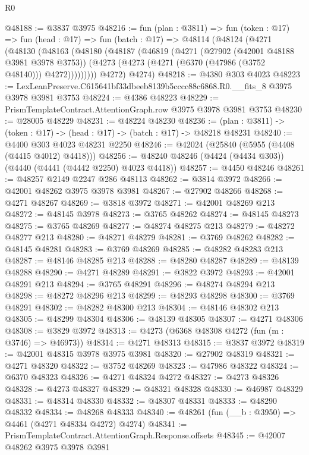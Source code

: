 \begin{lexlean}{R0}
\begin{coremodule}
@48188 := @3837 @3975
@48216 := fun (plan : @3811) =>
  fun (token : @17) =>
  fun (head : @17) =>
  fun (batch : @17) =>
  @48114
    (@48124
      (@4271
        (@48130
          (@48163
            (@48180
              (@48187
                (@46819
                  (@4271
                    (@27902 (@42001 @48188 @3981 @3978 @3753))
                    (@4273 (@4273 (@4271 (@6370 (@47986 (@3752 @48140))) @4272)))))))))
        @4272)
      @4274)
@48218 := @4380 @303 @4023
@48223 := LexLeanPreserve.C615641bf33dbeeb8139b5cccc88c6868.R0.__fits_8 @3975 @3978 @3981 @3753
@48224 := @4386 @48223
@48229 := PrismTemplateContract.AttentionGraph.row @3975 @3978 @3981 @3753
@48230 := @28005 @48229
@48231 := @48224 @48230
@48236 := (plan : @3811) -> (token : @17) -> (head : @17) -> (batch : @17) -> @48218 @48231
@48240 := @4400 @303 @4023 @48231 @2250
@48246 := @42024 (@25840 (@5955 (@4408 (@4415 @4012) @4418)))
@48256 := @48240 @48246 (@4424 (@4434 @303)) (@4440 (@4441 (@4442 @2250) @4023 @4418))
@48257 := @4450 @48246
@48261 := @48257 @2149 @2247 @286 @48113
@48262 := @3814 @3972
@48266 := @42001 @48262 @3975 @3978 @3981
@48267 := @27902 @48266
@48268 := @4271 @48267
@48269 := @3818 @3972
@48271 := @42001 @48269 @213
@48272 := @48145 @3978
@48273 := @3765 @48262
@48274 := @48145 @48273
@48275 := @3765 @48269
@48277 := @48274 @48275 @213
@48279 := @48272 @48277 @213
@48280 := @48271 @48279
@48281 := @3769 @48262
@48282 := @48145 @48281
@48283 := @3769 @48269
@48285 := @48282 @48283 @213
@48287 := @48146 @48285 @213
@48288 := @48280 @48287
@48289 := @48139 @48288
@48290 := @4271 @48289
@48291 := @3822 @3972
@48293 := @42001 @48291 @213
@48294 := @3765 @48291
@48296 := @48274 @48294 @213
@48298 := @48272 @48296 @213
@48299 := @48293 @48298
@48300 := @3769 @48291
@48302 := @48282 @48300 @213
@48304 := @48146 @48302 @213
@48305 := @48299 @48304
@48306 := @48139 @48305
@48307 := @4271 @48306
@48308 := @3829 @3972
@48313 := @4273 (@6368 @48308 @4272 (fun (m : @3746) => @46973))
@48314 := @4271 @48313
@48315 := @3837 @3972
@48319 := @42001 @48315 @3978 @3975 @3981
@48320 := @27902 @48319
@48321 := @4271 @48320
@48322 := @3752 @48269
@48323 := @47986 @48322
@48324 := @6370 @48323
@48326 := @4271 @48324 @4272
@48327 := @4273 @48326
@48328 := @4273 @48327
@48329 := @48321 @48328
@48330 := @46987 @48329
@48331 := @48314 @48330
@48332 := @48307 @48331
@48333 := @48290 @48332
@48334 := @48268 @48333
@48340 := @48261 (fun (__b : @3950) => @4461 (@4271 @48334 @4272) @4274)
@48341 := PrismTemplateContract.AttentionGraph.Response.offsets
@48345 := @42007 @48262 @3975 @3978 @3981

\end{coremodule}
\end{lexlean}
